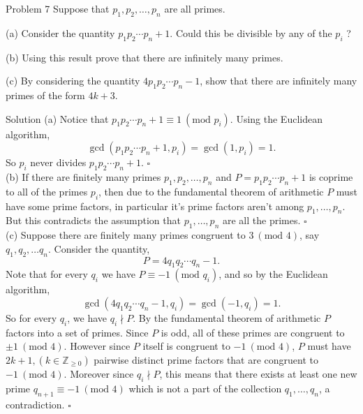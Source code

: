 \documentclass{article}
\begin{document}
\begin{problem}{Problem 7}
Suppose that $p_1, p_2, \ldots, p_n$ are all primes.\vspace{0.2cm}

(a) Consider the quantity $p_1 p_2 \cdots p_n + 1$. Could this be
divisible by any of the $p_i$ ? \vspace{0.2cm}

(b) Using this result prove that there are infinitely many primes.
\vspace{0.2cm}

(c) By considering the quantity $4p_1 p_2 \cdots p_n - 1$, show that there
are infinitely many primes of the form $4k+3$.
\end{problem}

\begin{solution}{Solution}
(a) Notice that $p_1 p_2 \cdots p_n + 1 \equiv 1 \ (\text{mod } p_i)$.
Using the Euclidean algorithm,
$$
\gcd(p_1 p_2 \cdots p_n + 1, p_i) =
\gcd(1, p_i) = 1.
$$
So $p_i$ never divides $p_1 p_2 \cdots p_n + 1$. $\square$
\\

(b) If there are finitely many primes $p_1, p_2, \ldots, p_n$ and
$P = p_1 p_2 \cdots p_n + 1$ is coprime to all of the primes $p_i$, then
due to the fundamental theorem of arithmetic $P$ must have some prime
factors, in particular it's prime factors aren't among
$p_1, \ldots, p_n$. But this contradicts the assumption that
$p_1,\ldots, p_n$ are all the primes. $\square$ \\

(c) Suppose there are finitely many primes congruent to
$3 \ (\text{mod } 4)$, say $q_1, q_2, \ldots q_n$. Consider the quantity,
$$
P = 4q_1 q_2 \cdots q_n - 1.
$$
Note that for every $q_i$ we have $P \equiv -1 \ (\text{mod } q_i)$, and
so by the Euclidean algorithm,
$$
\gcd(4q_1 q_2 \cdots q_n - 1, q_i) = \gcd(-1, q_i) = 1.
$$
So for every $q_i$, we have $q_i \nmid P$. By the fundamental theorem of
arithmetic $P$ factors into a set of primes. Since $P$ is odd, all of these
primes are congruent to $\pm 1 \ (\text{mod } 4)$. However since $P$ itself
is congruent to $-1 \ (\text{mod } 4)$, $P$ must have
$2k+1, (k \in \mathbb{Z}_{\geq0})$
pairwise distinct prime factors that are congruent to
$-1 \ (\text{mod } 4)$. Moreover since $q_i \nmid P$, this means that there
exists at least one new prime $q_{n+1} \equiv -1 \ (\text{mod } 4)$ which
is not a part of the collection $q_1, \ldots, q_n$, a contradiction.
$\square$\\


\end{solution}
\end{document}
